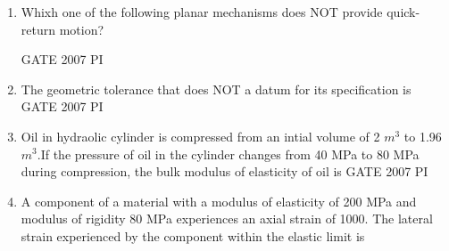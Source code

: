 \documentclass[journal,12pt,onecolumn]{IEEEtran}
\theoremstyle{remark}
\begin{document}
\begin{enumerate}
\item 
Whixh one of the following planar mechanisms does NOT provide quick-return motion?

\hfill{GATE 2007 PI}
\begin{enumerate}
    \end{enumerate}
    
    \item 
    The geometric tolerance that does NOT a datum for its specification is 
    \hfill{GATE 2007 PI}
    \begin{enumerate}
    \end{enumerate}
    
    \item 
    Oil in hydraolic cylinder is compressed from an intial volume of 2 $m^3$ to 1.96 $m^3$.If the pressure of oil in the cylinder changes from 40 MPa to 80 MPa during compression, the bulk modulus of elasticity of oil is
    \hfill{GATE 2007 PI}
    
    \begin{enumerate}
    \end{enumerate}
    
    \item 
    A component of a material with a modulus of elasticity of 200 MPa and modulus of rigidity 80 MPa experiences an axial strain of 1000. The lateral strain experienced by the component within the elastic limit is
    

\end{enumerate}
\end{document}

